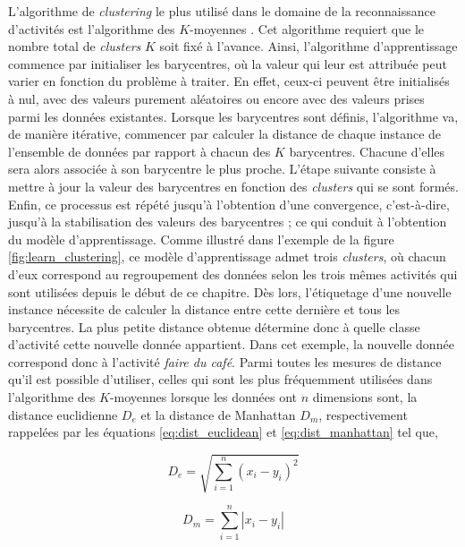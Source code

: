 L'algorithme de \textit{clustering} le plus utilisé dans le domaine de la reconnaissance d'activités est l'algorithme des $K$-moyennes \citep{Messing2009, Kovashka2010}. Cet algorithme requiert que le nombre total de \textit{clusters} $K$ soit fixé à l'avance. Ainsi, l'algorithme d'apprentissage commence par initialiser les barycentres, où la valeur qui leur est attribuée peut varier en fonction du problème à traiter. En effet, ceux-ci peuvent être initialisés à nul, avec des valeurs purement aléatoires ou encore avec des valeurs prises parmi les données existantes. Lorsque les barycentres sont définis, l'algorithme va, de manière itérative, commencer par calculer la distance de chaque instance de l'ensemble de données par rapport à chacun des $K$ barycentres. Chacune d'elles sera alors associée à son barycentre le plus proche. L'étape suivante consiste à mettre à jour la valeur des barycentres en fonction des \textit{clusters} qui se sont formés. Enfin, ce processus est répété jusqu'à l'obtention d'une convergence, c'est-à-dire, jusqu'à la stabilisation des valeurs des barycentres ; ce qui conduit à l'obtention du modèle d'apprentissage. Comme illustré dans l'exemple de la figure \ref{fig:learn_clustering}, ce modèle d'apprentissage admet trois \textit{clusters}, où chacun d'eux correspond au regroupement des données selon les trois mêmes activités qui sont utilisées depuis le début de ce chapitre. Dès lors, l'étiquetage d'une nouvelle instance nécessite de calculer la distance entre cette dernière et tous les barycentres. La plus petite distance obtenue détermine donc à quelle classe d'activité cette nouvelle donnée appartient. Dans cet exemple, la nouvelle donnée correspond donc à l'activité \og \textit{faire du café}\fg. Parmi toutes les mesures de distance qu'il est possible d'utiliser, celles qui sont les plus fréquemment utilisées dans l'algorithme des $K$-moyennes lorsque les données ont $n$ dimensions sont, la distance euclidienne $D_e$ et la distance de Manhattan $D_m$, respectivement rappelées par les équations \ref{eq:dist_euclidean} et \ref{eq:dist_manhattan} tel que,

\begin{equation}
	\label{eq:dist_euclidean}
	D_e = \sqrt{\sum_{i=1}^{n}(x_i-y_i)^2}
\end{equation}

\begin{equation}
	\label{eq:dist_manhattan}
	D_m = \sum_{i=1}^{n}\left|x_i-y_i\right|
\end{equation}


